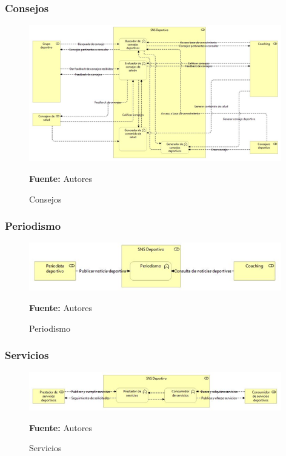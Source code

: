 \subsubsection{Consejos}

\begin{figure}[!htb]
  \begin{center}
    \includegraphics[width=11cm]{./imagenes/Archimate/vistas/business_functions/Consejos.png}
    \caption{Consejos}
    \label{fig:BF_Consejos}
    \textbf{Fuente:}  Autores
  \end{center}
\end{figure}

\subsubsection{Periodismo}

\begin{figure}[!htb]
  \begin{center}
    \includegraphics[width=11cm]{./imagenes/Archimate/vistas/business_functions/Periodismo.png}
    \caption{Periodismo}
    \label{fig:BF_Periodismo}
    \textbf{Fuente:}  Autores
  \end{center}
\end{figure}

\subsubsection{Servicios}

\begin{figure}[!htb]
  \begin{center}
    \includegraphics[width=11cm]{./imagenes/Archimate/vistas/business_functions/Servicios.png}
    \caption{Servicios}
    \label{fig:BF_Servicios}
    \textbf{Fuente:}  Autores
  \end{center}
\end{figure}


